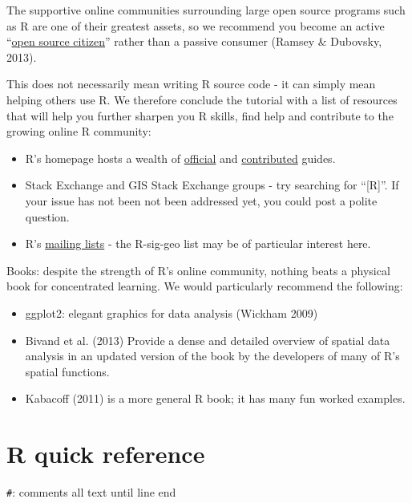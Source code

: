 \documentclass[]{article}
\begin{document}
The supportive online communities surrounding large open source programs
such as R are one of their greatest assets, so we recommend you become
an active
``\href{http://blog.cleverelephant.ca/2013/10/being-open-source-citizen.html}{open
source citizen}'' rather than a passive consumer (Ramsey \& Dubovsky,
2013).

This does not necessarily mean writing R source code - it can simply
mean helping others use R. We therefore conclude the tutorial with a
list of resources that will help you further sharpen you R skills, find
help and contribute to the growing online R community:

\begin{itemize}
\itemsep1pt\parskip0pt
\item
  R's homepage hosts a wealth of
  \href{http://cran.r-project.org/manuals.html}{official} and
  \href{http://cran.r-project.org/other-docs.html}{contributed} guides.
\item
  Stack Exchange and GIS Stack Exchange groups - try searching for
  ``{[}R{]}''. If your issue has not been not been addressed yet, you
  could post a polite question.
\item
  R's \href{http://www.r-project.org/mail.html}{mailing lists} - the
  R-sig-geo list may be of particular interest here.
\end{itemize}

Books: despite the strength of R's online community, nothing beats a
physical book for concentrated learning. We would particularly recommend
the following:

\begin{itemize}
\itemsep1pt\parskip0pt
\item
  ggplot2: elegant graphics for data analysis (Wickham 2009)
\item
  Bivand et al. (2013) Provide a dense and detailed overview of spatial
  data analysis in an updated version of the book by the developers of
  many of R's spatial functions.
\item
  Kabacoff (2011) is a more general R book; it has many fun worked
  examples.
\end{itemize}

\section{R quick reference}\label{r-quick-reference}

\texttt{\#}: comments all text until line end
\end{document}
